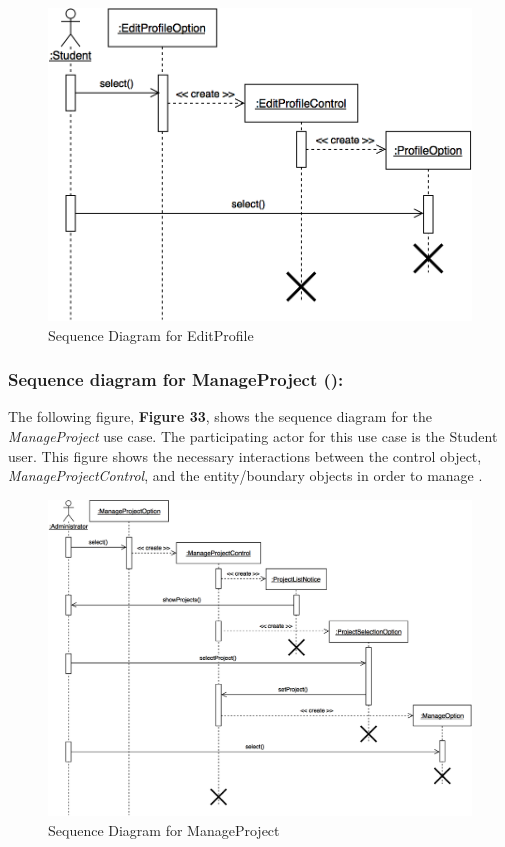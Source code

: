 \documentclass[12pt,letterpaper]{article}
\begin{document}
\begin{figure}[H]
	\centering{}
	\includegraphics[scale=0.3]{imgs/seq/edit-profile.png}
	\caption{Sequence Diagram for EditProfile}
\end{figure}

\subsubsection*{Sequence diagram for ManageProject (\manageproject{}):}

The following figure, {\bf Figure 33}, shows the sequence diagram for the {\it ManageProject} use case. The participating actor for this use case is the
Student user. This figure shows the necessary interactions between the control object, {\it ManageProjectControl}, and the entity/boundary objects 
in order to manage \manageproject{}.

\begin{figure}[H]
	\centering{}
	\includegraphics[scale=0.3]{imgs/seq/manage-project.png}
	\caption{Sequence Diagram for ManageProject}
\end{figure}
\end{document}
